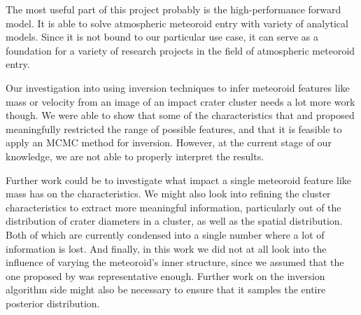 \label{sec:discussion}
The most useful part of this project probably is the high-performance forward model. It is able to solve atmospheric meteoroid entry with variety of analytical models.
Since it is not bound to our particular use case, it can serve as a foundation for a variety of research projects in the field of atmospheric meteoroid entry.

Our investigation into using inversion techniques to infer meteoroid features like mass or velocity from an image of an impact crater cluster needs a lot more work though. We were able to show that some of the characteristics that \cite{daubar2019recently} and \cite{newland2019CFM18} proposed meaningfully restricted the range of possible features, and that it is feasible to apply an MCMC method for inversion. However, at the current stage of our knowledge, we are not able to properly interpret the results.

Further work could be to investigate what impact a single meteoroid feature like mass has on the characteristics. We might also look into refining the cluster characteristics to extract more meaningful information, particularly out of the distribution of crater diameters in a cluster, as well as the spatial distribution. Both of which are currently condensed into a single number where a lot of information is lost. And finally, in this work we did not at all look into the influence of varying the meteoroid's inner structure, since we assumed that the one proposed by \cite{newland2019CFM18} was representative enough. Further work on the inversion algorithm side might also be necessary to ensure that it samples the entire posterior distribution.
